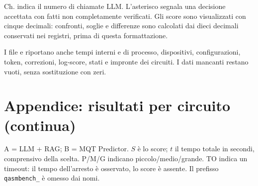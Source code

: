 \documentclass[11pt,a4paper]{article}
\renewcommand{\arraystretch}{1.2}
\begin{document}
\endgroup

Ch. indica il numero di chiamate LLM. L'asterisco segnala una decisione
accettata con fatti non completamente verificati. Gli score sono visualizzati
con cinque decimali: confronti, soglie e differenze sono calcolati dai dieci decimali
conservati nei registri, prima di questa formattazione.

I file  e  riportano anche
tempi interni e di processo, dispositivi, configurazioni, token, correzioni,
log-score, stati e impronte dei circuiti. I dati mancanti restano vuoti,
senza sostituzione con zeri.

\clearpage\section{Appendice: risultati per circuito (continua)}

A = LLM + RAG; B = MQT Predictor. $S$ è lo score; $t$ il tempo totale
in secondi, comprensivo della scelta. P/M/G indicano piccolo/medio/grande.
TO indica un timeout: il tempo dell'arresto è osservato, lo score è assente.
Il prefisso \texttt{qasmbench\_} è omesso dai nomi.

\begingroup\footnotesize\renewcommand{\arraystretch}{1.45}
\end{document}
